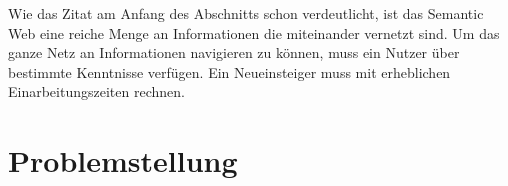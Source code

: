 Wie das Zitat am Anfang des Abschnitts schon verdeutlicht, ist das Semantic Web eine reiche Menge an Informationen die miteinander vernetzt sind. 
Um das ganze Netz an Informationen navigieren zu können, muss ein Nutzer über bestimmte Kenntnisse verfügen.
Ein Neueinsteiger muss mit erheblichen Einarbeitungszeiten rechnen.






\section{Problemstellung}\label{sec:problemstellung}


